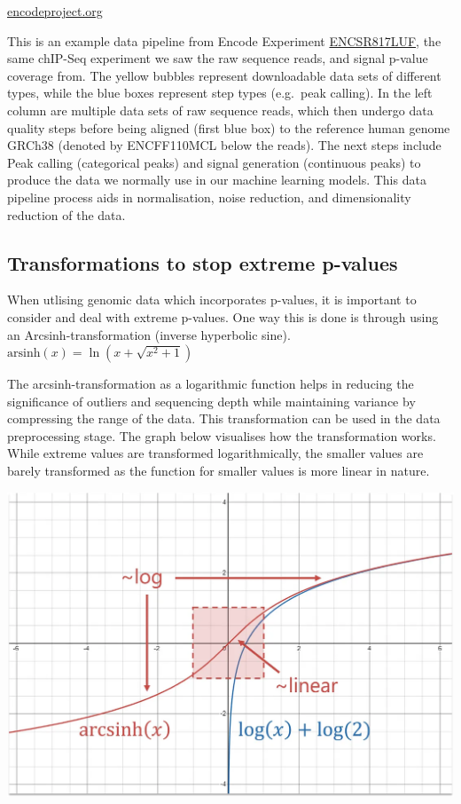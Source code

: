 \documentclass[
]{book}
\begin{document}
\href{https://www.encodeproject.org/experiments/ENCSR817LUF/}{encodeproject.org}

This is an example data pipeline from Encode Experiment \href{https://www.encodeproject.org/experiments/ENCSR817LUF/}{ENCSR817LUF}, the same chIP-Seq experiment we saw the raw sequence reads, and signal p-value coverage from. The yellow bubbles represent downloadable data sets of different types, while the blue boxes represent step types (e.g.~peak calling). In the left column are multiple data sets of raw sequence reads, which then undergo data quality steps before being aligned (first blue box) to the reference human genome GRCh38 (denoted by ENCFF110MCL below the reads). The next steps include Peak calling (categorical peaks) and signal generation (continuous peaks) to produce the data we normally use in our machine learning models. This data pipeline process aids in normalisation, noise reduction, and dimensionality reduction of the data.

\subsection{Transformations to stop extreme p-values}\label{transformations-to-stop-extreme-p-values}

When utlising genomic data which incorporates p-values, it is important to consider and deal with extreme p-values. One way this is done is through using an Arcsinh-transformation (inverse hyperbolic sine).
\(\text{arsinh}(x) = \ln \left( x + \sqrt{x^2 + 1} \right)\)

The arcsinh-transformation as a logarithmic function helps in reducing the significance of outliers and sequencing depth while maintaining variance by compressing the range of the data. This transformation can be used in the data preprocessing stage. The graph below visualises how the transformation works. While extreme values are transformed logarithmically, the smaller values are barely transformed as the function for smaller values is more linear in nature.

\includegraphics{images/arcsinh.png}
\end{document}
